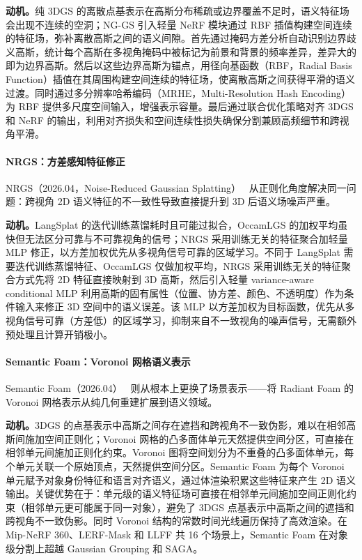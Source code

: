 \textbf{动机。}纯 3DGS 的离散点基表示在高斯分布稀疏或边界覆盖不足时，语义特征场会出现不连续的空洞；NG-GS 引入轻量 NeRF 模块通过 RBF 插值构建空间连续的特征场，弥补离散高斯之间的语义间隙。首先通过掩码方差分析自动识别边界歧义高斯，统计每个高斯在多视角掩码中被标记为前景和背景的频率差异，差异大的即为边界高斯。然后以这些边界高斯为锚点，用径向基函数（RBF，Radial Basis Function）插值在其周围构建空间连续的特征场，使离散高斯之间获得平滑的语义过渡。同时通过多分辨率哈希编码（MRHE，Multi-Resolution Hash Encoding）为 RBF 提供多尺度空间输入，增强表示容量。最后通过联合优化策略对齐 3DGS 和 NeRF 的输出，利用对齐损失和空间连续性损失确保分割兼顾高频细节和跨视角平滑。

\paragraph{NRGS：方差感知特征修正} NRGS（2026.04，Noise-Reduced Gaussian Splatting）~\cite{2604_22439} 从正则化角度解决同一问题：跨视角 2D 语义特征的不一致性导致直接提升到 3D 后语义场噪声严重。

\textbf{动机。}LangSplat 的迭代训练蒸馏耗时且可能过拟合，OccamLGS 的加权平均虽快但无法区分可靠与不可靠视角的信号；NRGS 采用训练无关的特征聚合加轻量 MLP 修正，以方差加权优先从多视角信号可靠的区域学习。不同于 LangSplat 需要迭代训练蒸馏特征、OccamLGS 仅做加权平均，NRGS 采用训练无关的特征聚合方式先将 2D 特征直接映射到 3D 高斯，然后引入轻量 variance-aware conditional MLP 利用高斯的固有属性（位置、协方差、颜色、不透明度）作为条件输入来修正 3D 空间中的语义误差。该 MLP 以方差加权为目标函数，优先从多视角信号可靠（方差低）的区域学习，抑制来自不一致视角的噪声信号，无需额外预处理且计算开销极小。

\paragraph{Semantic Foam：Voronoi 网格语义表示} Semantic Foam（2026.04）~\cite{2604_26262} 则从根本上更换了场景表示——将 Radiant Foam 的 Voronoi 网格表示从纯几何重建扩展到语义领域。

\textbf{动机。}3DGS 的点基表示中高斯之间存在遮挡和跨视角不一致伪影，难以在相邻高斯间施加空间正则化；Voronoi 网格的凸多面体单元天然提供空间分区，可直接在相邻单元间施加正则化约束。Voronoi 图将空间划分为不重叠的凸多面体单元，每个单元关联一个原始顶点，天然提供空间分区。Semantic Foam 为每个 Voronoi 单元赋予对象身份特征和语言对齐语义，通过体渲染积累这些特征来产生 2D 语义输出。关键优势在于：单元级的语义特征场可直接在相邻单元间施加空间正则化约束（相邻单元更可能属于同一对象），避免了 3DGS 点基表示中高斯之间的遮挡和跨视角不一致伪影。同时 Voronoi 结构的常数时间光线遍历保持了高效渲染。在 Mip-NeRF 360、LERF-Mask 和 LLFF 共 16 个场景上，Semantic Foam 在对象级分割上超越 Gaussian Grouping 和 SAGA。

